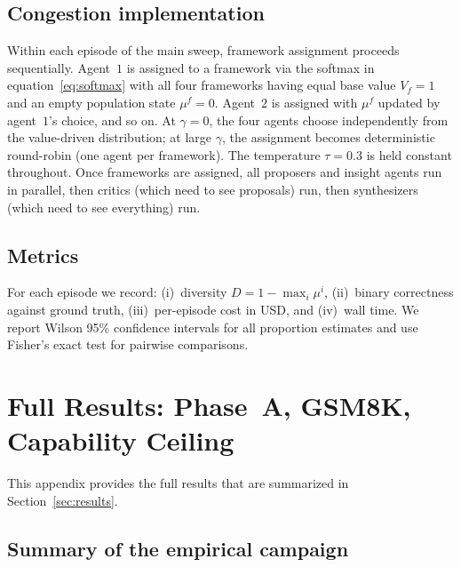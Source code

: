 \documentclass[11pt]{amsart}
\newcommand{\g}{\gamma}
\newcommand\1{{\mathds{1}}}
\theoremstyle{definition}
\theoremstyle{remark}
\numberwithin{equation}{section}
\begin{document}
\subsection{Congestion implementation}\label{app:congestion-impl}

Within each episode of the main sweep, framework assignment proceeds sequentially.
Agent~$1$ is assigned to a framework via the softmax in equation~\eqref{eq:softmax} with all four frameworks having equal base value $V_f = 1$ and an empty population state $\mu^f = 0$.
Agent~$2$ is assigned with $\mu^f$ updated by agent~$1$'s choice, and so on.
At $\g = 0$, the four agents choose independently from the value-driven distribution; at large $\g$, the assignment becomes deterministic round-robin (one agent per framework).
The temperature $\tau = 0.3$ is held constant throughout.
Once frameworks are assigned, all proposers and insight agents run in parallel, then critics (which need to see proposals) run, then synthesizers (which need to see everything) run.

\subsection{Metrics}\label{app:metrics}

For each episode we record: (i)~diversity $D = 1 - \max_i \mu^i$, (ii)~binary correctness against ground truth, (iii)~per-episode cost in USD, and (iv)~wall time.
We report Wilson 95\% confidence intervals \cite{Wilson1927} for all proportion estimates and use Fisher's exact test for pairwise comparisons.

\section{Full Results: Phase~A, GSM8K, Capability Ceiling}\label{app:full-results}

This appendix provides the full results that are summarized in Section~\ref{sec:results}.

\subsection{Summary of the empirical campaign}\label{app:summary}
\end{document}
